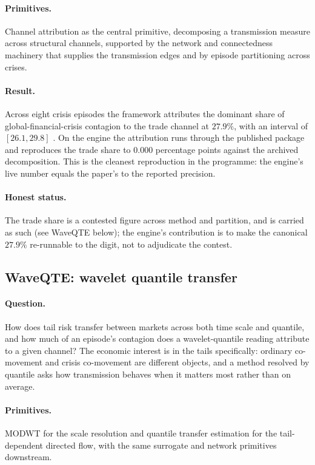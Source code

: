 \paragraph{Primitives.} Channel attribution as the central primitive,
decomposing a transmission measure across structural channels, supported by the
network and connectedness machinery that supplies the transmission edges and by
episode partitioning across crises.

\paragraph{Result.} Across eight crisis episodes the framework attributes the
dominant share of global-financial-crisis contagion to the trade channel at
$27.9\%$, with an interval of $[26.1, 29.8]$
\citep{bhandari2026contagion,ccpkg}. On the engine the attribution runs through
the published  package and reproduces the trade share to
$0.000$ percentage points against the archived decomposition. This is the cleanest
reproduction in the programme: the engine's live number equals the paper's to the
reported precision.

\paragraph{Honest status.} The trade share is a contested figure across method
and partition, and is carried as such (see WaveQTE below); the engine's
contribution is to make the canonical $27.9\%$ re-runnable to the digit, not to
adjudicate the contest.

\subsection{WaveQTE: wavelet quantile transfer}
\label{sec:elem-waveqte}

\paragraph{Question.} How does tail risk transfer between markets across both
time scale and quantile, and how much of an episode's contagion does a
wavelet-quantile reading attribute to a given channel? The economic interest is
in the tails specifically: ordinary co-movement and crisis co-movement are
different objects, and a method resolved by quantile asks how transmission behaves
when it matters most rather than on average.

\paragraph{Primitives.} MODWT for the scale resolution and quantile transfer
estimation for the tail-dependent directed flow, with the same surrogate and
network primitives downstream.

